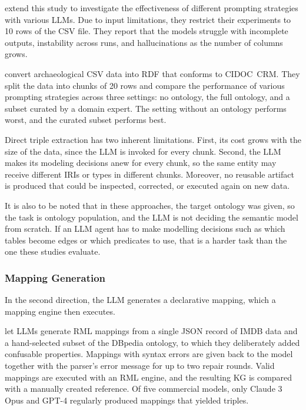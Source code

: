 \citet{pellegrino2025quality} extend this study to investigate the effectiveness of different prompting strategies with various LLMs. Due to input limitations, they restrict their experiments to 10 rows of the CSV file. They report that the models struggle with incomplete outputs, instability across runs, and hallucinations as the number of columns grows. 

\citet{hariri2025towards} convert archaeological CSV data into RDF that conforms to CIDOC~CRM\@. They split the data into chunks of 20 rows and compare the performance of various prompting strategies across three settings: no ontology, the full ontology, and a subset curated by a domain expert. The setting without an ontology performs worst, and the curated subset performs best.

Direct triple extraction has two inherent limitations. First, its cost grows with the size of the data, since the LLM is invoked for every chunk. Second, the LLM makes its modeling decisions anew for every chunk, so the same entity may receive different IRIs or types in different chunks. Moreover, no reusable artifact is produced that could be inspected, corrected, or executed again on new data.

It is also to be noted that in these approaches, the target ontology was given, so the task is ontology population, and the LLM is not deciding the semantic model from scratch. If an LLM agent has to make modelling decisions such as which tables become edges or which predicates to use, that is a harder task than the one these studies evaluate.

\subsubsection{Mapping Generation}
In the second direction, the LLM generates a declarative mapping, which a mapping engine then executes. 


\citet{hofer2024towards} let LLMs generate RML mappings from a single JSON record of IMDB data and a hand-selected subset of the DBpedia ontology, to which they deliberately added confusable properties. Mappings with syntax errors are given back to the model together with the parser's error message for up to two repair rounds. Valid mappings are executed with an RML engine, and the resulting KG is compared with a manually created reference. Of five commercial models, only Claude 3 Opus and GPT-4 regularly produced mappings that yielded triples.

